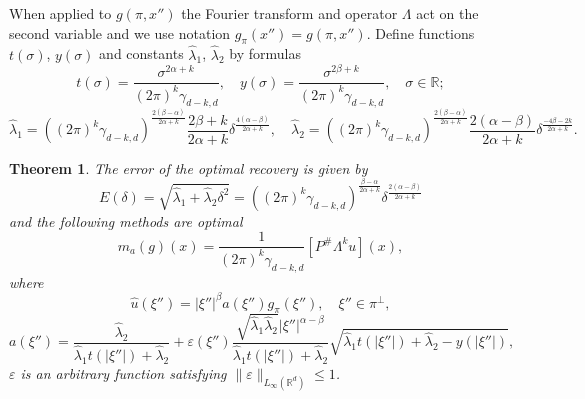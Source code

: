 \documentclass[12pt]{iopart}
\newtheorem{theorem}{Theorem}
\begin{document}
	When applied to $g(\pi,x'')$ the Fourier transform and operator $\Lambda$ act on the second variable and we use notation $g_\pi(x'')=g(\pi,x'')$. Define functions $t(\sigma)$, $y(\sigma)$ and constants $\widehat\lambda_1$, $\widehat\lambda_2$ by formulas
	\begin{equation}
	\label{xy}
	t(\sigma)=\frac{\sigma^{2\alpha+k}}{(2\pi)^{k}\gamma_{d-k,d}},\quad
	y(\sigma)=\frac{\sigma^{2\beta+k}}{(2\pi)^{k}\gamma_{d-k,d}},\quad \sigma\in\mathbb R;
	\end{equation}
	\begin{equation}
	\label{lambda}
	\widehat\lambda_1=((2\pi)^k\gamma_{d-k,d})^{\frac{2(\beta-\alpha)}{2\alpha+k}}\frac{2\beta+k}{2\alpha+k}\delta^\frac{4(\alpha-\beta)}{2\alpha+k},\quad \widehat\lambda_2=((2\pi)^k\gamma_{d-k,d})^{\frac{2(\beta-\alpha)}{2\alpha+k}}\frac{2(\alpha-\beta)}{2\alpha+k}\delta^\frac{-4\beta-2k}{2\alpha+k}. 
	\end{equation}
	
	\begin{theorem}
		\label{theorem}
		The error of the optimal recovery is given by
		\[
		E(\delta)=\sqrt{\widehat\lambda_1+\widehat\lambda_2\delta^2}=((2\pi)^k\gamma_{d-k,d})^{\frac{\beta-\alpha}{2\alpha+k}}\delta^{\frac{2(\alpha-\beta)}{2\alpha+k}}
		\]
		and the following methods are optimal
		\begin{equation}
		\label{method}
		m_a(g)(x) = \frac{1}{(2\pi)^k\gamma_{d-k,d}}[P^\#\Lambda^ku](x),
		\end{equation}
		where	
		$$\widehat{u}(\xi'')=|\xi''|^\beta a(\xi'')\widehat{g_\pi }(\xi''),\quad \xi''\in\pi^\perp,$$
		\begin{equation}
		\label{a}
		a(\xi'')=\frac{\widehat\lambda_2}{\widehat\lambda_1t(|\xi''|)+\widehat\lambda_2}+\varepsilon(\xi'')\frac{\sqrt{\widehat\lambda_1\widehat\lambda_2}|\xi''|^{\alpha-\beta}}{\widehat\lambda_1t(|\xi''|)+\widehat\lambda_2}\sqrt{\widehat\lambda_1t(|\xi''|)+\widehat\lambda_2-y(|\xi''|)},
		\end{equation}
		$\varepsilon$ is an arbitrary function satisfying $\|\varepsilon\|_{L_\infty(\mathbb R^d)}\leqslant 1$.
	\end{theorem}
	
\end{document}
